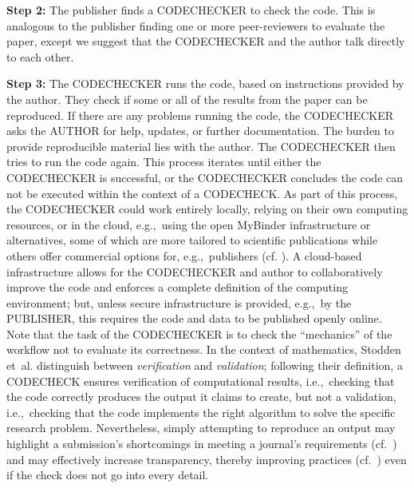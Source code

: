 \documentclass[12pt]{article}
\begin{document}
\textbf{Step 2:} The publisher finds a CODECHECKER to check the
code. This is analogous to the publisher finding one or more
peer-reviewers to evaluate the paper, except we suggest that the
CODECHECKER and the author talk directly to each other.

\textbf{Step 3:} The CODECHECKER runs the code, based on instructions provided by
the author. They check if some or all of the results from the paper can be
reproduced. If there are
any problems running the code, the CODECHECKER asks the AUTHOR for help,
updates, or further documentation.
The burden to provide reproducible material lies with the author.
The CODECHECKER then tries to run the code again.
This process iterates until either the CODECHECKER is successful,
or the CODECHECKER concludes the code can not be executed within the context of a CODECHECK.
As part of this process, the CODECHECKER could work entirely locally, relying on their own computing resources, or in the cloud, e.g.,~using the open MyBinder infrastructure \cite{jupyter_binder_2018} or alternatives, some of which are more tailored to scientific publications while others offer commercial options for, e.g.,~publishers (cf. \cite{konkol_publishing_2020}).
A cloud-based infrastructure allows for the CODECHECKER and author to collaboratively improve the code and enforces a complete definition of the computing environment; but, unless secure infrastructure is provided, e.g.,~by the PUBLISHER, this requires the code and data to be published openly online.
Note that the task of the CODECHECKER is to check the ``mechanics'' of the workflow not to evaluate its correctness. 
In the context of mathematics, Stodden et~al. \cite{stodden_setting_2013} distinguish between \emph{verification} and \emph{validation};
following their definition, a CODECHECK ensures verification
of computational results, i.e.,~checking that the code correctly produces the output it claims to create, but not a validation, i.e.,~checking that the code implements the right algorithm to solve the specific research problem.
Nevertheless, simply attempting to reproduce an output may highlight a submission's shortcomings in meeting a journal's requirements (cf.~\cite{christian_journal_2020}) and may effectively increase transparency, thereby improving practices (cf.~\cite{nosek_scientific_2012}) even if the check does not go into every detail.
\end{document}
